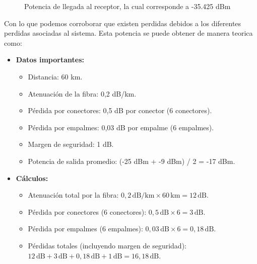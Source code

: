 \begin{enumerate}
\begin{itemize}
\begin{figure}
			\caption{Potencia de llegada al receptor, la cual corresponde a -35.425 dBm}
			\label{fig:imagen1}
		\end{figure}
		Con lo que podemos corroborar que existen perdidas debidos a los diferentes perdidas asociadas al sistema. Esta potencia se puede obtener de manera teorica como:
		\begin{itemize}
			\item \textbf{Datos importantes:}
			\begin{itemize}
				\item Distancia: 60 km.
				\item Atenuación de la fibra: 0,2 dB/km.
				\item Pérdida por conectores: 0,5 dB por conector (6 conectores).
				\item Pérdida por empalmes: 0,03 dB por empalme (6 empalmes).
				\item Margen de seguridad: 1 dB.
				\item Potencia de salida promedio: (-25 dBm + -9 dBm) / 2 = -17 dBm.
			\end{itemize}
			
			\item \textbf{Cálculos:}
			\begin{itemize}
				\item Atenuación total por la fibra: \( 0,2 \, \text{dB/km} \times 60 \, \text{km} = 12 \, \text{dB} \).
				\item Pérdida por conectores (6 conectores): \( 0,5 \, \text{dB} \times 6 = 3 \, \text{dB} \).
				\item Pérdida por empalmes (6 empalmes): \( 0,03 \, \text{dB} \times 6 = 0,18 \, \text{dB} \).
				\item Pérdidas totales (incluyendo margen de seguridad): \( 12 \, \text{dB} + 3 \, \text{dB} + 0,18 \, \text{dB} + 1 \, \text{dB} = 16,18 \, \text{dB} \).
			\end{itemize}
			

\end{itemize}
\end{itemize}
\end{enumerate}
